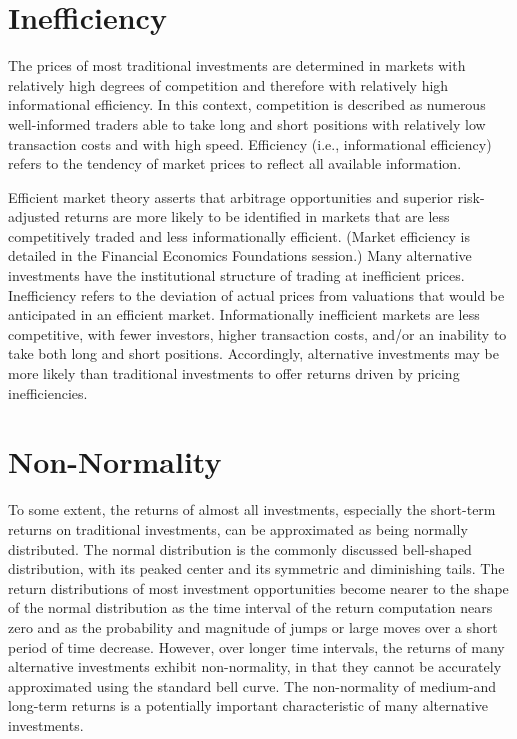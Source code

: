 \documentclass[11pt]{article}
\begin{document}
\section*{Inefficiency}
The prices of most traditional investments are determined in markets with relatively high degrees of competition and therefore with relatively high informational efficiency. In this context, competition is described as numerous well-informed traders able to take long and short positions with relatively low transaction costs and with high speed. Efficiency (i.e., informational efficiency) refers to the tendency of market prices to reflect all available information.

Efficient market theory asserts that arbitrage opportunities and superior risk-adjusted returns are more likely to be identified in markets that are less competitively traded and less informationally efficient. (Market efficiency is detailed in the Financial Economics Foundations session.) Many alternative investments have the institutional structure of trading at inefficient prices. Inefficiency refers to the deviation of actual prices from valuations that would be anticipated in an efficient market. Informationally inefficient markets are less competitive, with fewer investors, higher transaction costs, and/or an inability to take both long and short positions. Accordingly, alternative investments may be more likely than traditional investments to offer returns driven by pricing inefficiencies.

\section*{Non-Normality}
To some extent, the returns of almost all investments, especially the short-term returns on traditional investments, can be approximated as being normally distributed. The normal distribution is the commonly discussed bell-shaped distribution, with its peaked center and its symmetric and diminishing tails. The return distributions of most investment opportunities become nearer to the shape of the normal distribution as the time interval of the return computation nears zero and as the probability and magnitude of jumps or large moves over a short period of time decrease. However, over longer time intervals, the returns of many alternative investments exhibit non-normality, in that they cannot be accurately approximated using the standard bell curve. The non-normality of medium-and long-term returns is a potentially important characteristic of many alternative investments.
\end{document}
